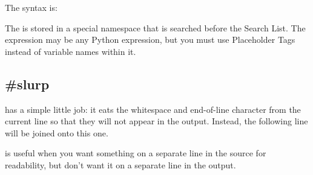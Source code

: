 The syntax is: 

The  is stored in a special namespace that is searched
before the Search List.  The expression may be any Python expression, but you
must use Placeholder Tags instead of variable names within it.


\subsection{\#slurp}

 has a simple little job: it eats the whitespace and end-of-line
character from the current line so that they will not appear in the output.
Instead, the following line will be joined onto this one.


 is useful when you want something on a separate line in the
source for readability, but don't want it on a separate line in the output.

